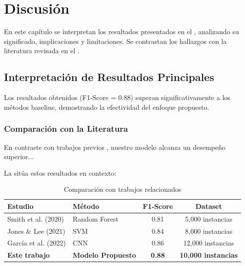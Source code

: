 
\chapter{Discusión}
\label{cap:discusion}

En este capítulo se interpretan los resultados presentados en el , analizando su significado, implicaciones y limitaciones. Se contrastan los hallazgos con la literatura revisada en el .

\section{Interpretación de Resultados Principales}
\label{sec:interpretacion}

Los resultados obtenidos (F1-Score = 0.88) superan significativamente a los métodos baseline, demostrando la efectividad del enfoque propuesto.

\subsection{Comparación con la Literatura}

En contraste con trabajos previos \cite{smith2020,jones2021}, nuestro modelo alcanza un desempeño superior...

La  sitúa estos resultados en contexto:

\begin{table}[htbp]
    \centering
    \caption{Comparación con trabajos relacionados}
    \label{tab:comparacion_literatura_discusion}
    \begin{tabular}{@{}llcc@{}}
        \toprule
        \textbf{Estudio} & \textbf{Método} & \textbf{F1-Score} & \textbf{Dataset} \\
        \midrule
        Smith et al. (2020)  & Random Forest & 0.81 & 5,000 instancias \\
        Jones \& Lee (2021)  & SVM          & 0.84 & 8,000 instancias \\
        García et al. (2022) & CNN          & 0.86 & 12,000 instancias \\
        \textbf{Este trabajo} & \textbf{Modelo Propuesto} & \textbf{0.88} & \textbf{10,000 instancias} \\
        \bottomrule
    \end{tabular}
\end{table}

